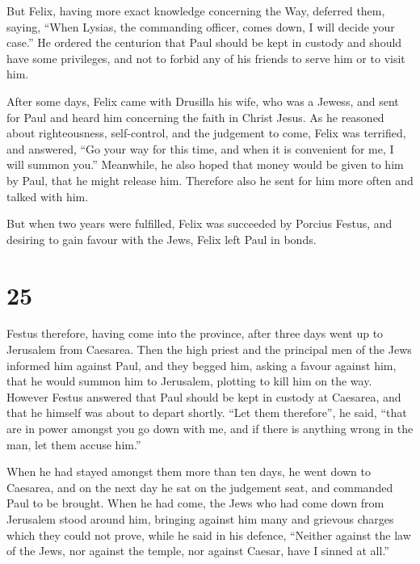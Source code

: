  But Felix, having more exact knowledge concerning the Way,
deferred them, saying, ``When Lysias, the commanding officer, comes
down, I will decide your case.''  He ordered the centurion
that Paul should be kept in custody and should have some privileges, and
not to forbid any of his friends to serve him or to visit him.

 After some days, Felix came with Drusilla his wife, who
was a Jewess, and sent for Paul and heard him concerning the faith in
Christ Jesus.  As he reasoned about righteousness,
self-control, and the judgement to come, Felix was terrified, and
answered, ``Go your way for this time, and when it is convenient for me,
I will summon you.''  Meanwhile, he also hoped that money
would be given to him by Paul, that he might release him. Therefore also
he sent for him more often and talked with him.

 But when two years were fulfilled, Felix was succeeded by
Porcius Festus, and desiring to gain favour with the Jews, Felix left
Paul in bonds.

\hypertarget{section-24}{%
\section{25}\label{section-24}}

 Festus therefore, having come into the province, after
three days went up to Jerusalem from Caesarea.  Then the
high priest and the principal men of the Jews informed him against Paul,
and they begged him,  asking a favour against him, that he
would summon him to Jerusalem, plotting to kill him on the way.
 However Festus answered that Paul should be kept in custody
at Caesarea, and that he himself was about to depart shortly.
 ``Let them therefore'', he said, ``that are in power
amongst you go down with me, and if there is anything wrong in the man,
let them accuse him.''

 When he had stayed amongst them more than ten days, he went
down to Caesarea, and on the next day he sat on the judgement seat, and
commanded Paul to be brought.  When he had come, the Jews
who had come down from Jerusalem stood around him, bringing against him
many and grievous charges which they could not prove,  while
he said in his defence, ``Neither against the law of the Jews, nor
against the temple, nor against Caesar, have I sinned at all.''

